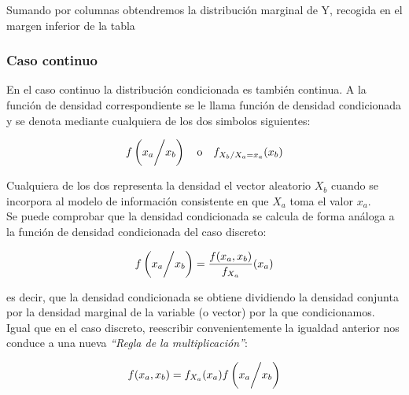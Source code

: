 \begin{theorem}
    Sumando por columnas obtendremos la distribución marginal de Y, recogida en el margen inferior de la tabla


\end{theorem}

\subsubsection{Caso continuo}
En el caso continuo la distribución condicionada es también continua. A la función de densidad correspondiente se le llama función
de densidad condicionada y se denota mediante cualquiera de los dos simbolos siguientes:

\[ f\left( x_a \bigg{/} x_b \right) \quad \text{o} \quad f_{X_b / X_a = x_a}(x_b) \]

Cualquiera de los dos representa la densidad el vector aleatorio $X_b$ cuando se incorpora al modelo de información consistente en
que $X_a$ toma el valor $x_a$. \\
Se puede comprobar que la densidad condicionada se calcula de forma análoga a la función de densidad condicionada del caso discreto:

\[ f\left( x_a \bigg{/} x_b \right) = \frac{f(x_a, x_b)}{f_{X_a}}(x_a) \]

es decir, que la densidad condicionada se obtiene dividiendo la densidad conjunta por la densidad marginal de la variable (o vector)
por la que condicionamos. \\
Igual que en el caso discreto, reescribir convenientemente la igualdad anterior nos conduce a una nueva \textit{``Regla de la multiplicación''}:

\[ f(x_a, x_b) = f_{X_a}(x_a)f\left( x_a \bigg{/} x_b \right) \]

